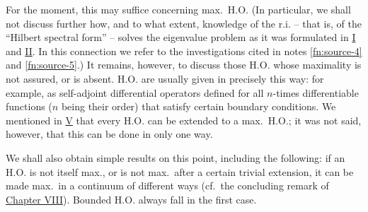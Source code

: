 ﻿\documentclass[paper=b5,fontsize=13pt,bookmarkpackage=false,twoside]{scrartcl}
\begin{document}
For the moment, this may suffice concerning max.\ H.O. (In particular, we shall not discuss further how, and to what extent, knowledge of the r.i. -- that is, of the ``Hilbert spectral form'' -- solves the eigenvalue problem as it was formulated in \hyperref[intro:I]{I} and \hyperref[intro:II]{II}. In this connection we refer to the investigations cited in notes \ref{fn:source-4} and \ref{fn:source-5}.) It remains, however, to discuss those H.O. whose maximality is not assured, or is absent. H.O. are usually given in precisely this way: for example, as self-adjoint differential operators defined for all $n$-times differentiable functions ($n$ being their order) that satisfy certain boundary conditions. We mentioned in \hyperref[intro:V]{V} that every H.O. can be extended to a max.\ H.O.; it was not said, however, that this can be done in only one way.

We shall also obtain simple results on this point, including the following: if an H.O. is not itself max., or is not max.\ after a certain trivial extension, it can be made max.\ in a continuum of different ways (cf.\ the concluding remark of \hyperref[chap:VIII]{Chapter VIII}). Bounded H.O. always fall in the first case.
\end{document}
